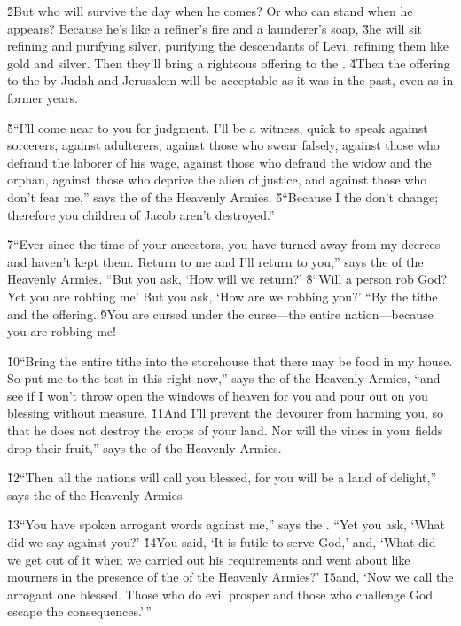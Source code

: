 \v{2}But who will survive the day when he comes? Or who can stand when he appears? Because he's like a refiner's fire and a launderer's soap, \v{3}he will sit refining and purifying silver, purifying the descendants of Levi, refining them like gold and silver. Then they'll bring a righteous offering to the . \v{4}Then the offering to the  by Judah and Jerusalem will be acceptable as it was in the past, even as in former years.

\v{5}``I'll come near to you for judgment. I'll be a witness, quick to speak against sorcerers, against adulterers, against those who swear falsely, against those who defraud the laborer of his wage, against those who defraud the widow and the orphan, against those who deprive the alien of justice, and against those who don't fear me,'' says the  of the Heavenly Armies. \v{6}``Because I the  don't change; therefore you children of Jacob aren't destroyed.''

\v{7}``Ever since the time of your ancestors, you have turned away from my decrees and haven't kept them. Return to me and I'll return to you,'' says the  of the Heavenly Armies. ``But you ask, `How will we return?' \v{8}``Will a person rob God? Yet you are robbing me! But you ask, `How are we robbing you?' ``By the tithe and the offering. \v{9}You are cursed under the curse---the entire nation---because you are robbing me!

\v{10}``Bring the entire tithe into the storehouse that there may be food in my house. So put me to the test in this right now,'' says the  of the Heavenly Armies, ``and see if I won't throw open the windows of heaven for you and pour out on you blessing without measure. \v{11}And I'll prevent the devourer from harming you, so that he does not destroy the crops of your land. Nor will the vines in your fields drop their fruit,'' says the  of the Heavenly Armies.

\v{12}``Then all the nations will call you blessed, for you will be a land of delight,'' says the  of the Heavenly Armies.

\v{13}``You have spoken arrogant words against me,'' says the . ``Yet you ask, `What did we say against you?' \v{14}You said, `It is futile to serve God,' and, `What did we get out of it when we carried out his requirements and went about like mourners in the presence of the  of the Heavenly Armies?' \v{15}and, `Now we call the arrogant one blessed. Those who do evil prosper and those who challenge God escape the consequences.'\,''

